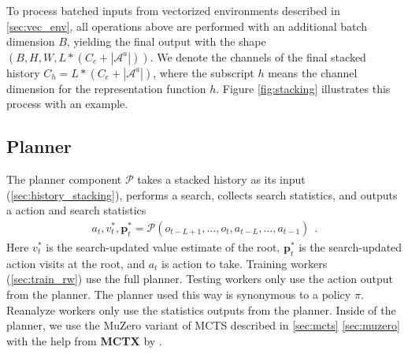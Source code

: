 To process batched inputs from vectorized environments described in \ref{sec:vec_env}, all operations above are performed with an additional batch dimension $B$, yielding the final output with the shape $(B, H, W, L * (C_e + |\mathcal{A}^a|))$.
We denote the channels of the final stacked history $C_h = L * (C_e + |\mathcal{A}^a|)$, where the subscript $h$ means the channel dimension for the representation function $h$.
Figure \ref{fig:stacking} illustrates this process with an example.


\subsection{Planner} \label{sec:planner}
The planner component $\mathcal{P}$ takes a stacked history as its input (\ref{sec:history_stacking}), performs a search, collects search statistics, and outputs a action and search statistics
\begin{align*}
    a_t, v^*_t, \mathbf{p}^*_t = \mathcal{P}(o_{t - L + 1}, \dots, o_t, a_{t - L}, \dots, a_{t - 1}) ~~ .
\end{align*}
Here $v^*_t$ is the search-updated value estimate of the root, $\mathbf{p}^*_t$ is the search-updated action visits at the root, and $a_t$ is action to take.
Training workers (\ref{sec:train_rw}) use the full planner.
Testing workers only use the action output from the planner.
The planner used this way is synonymous to a policy $\pi$.
Reanalyze workers only use the statistics outputs from the planner.
Inside of the planner, we use the MuZero variant of MCTS described in \ref{sec:mcts} \ref{sec:muzero} with the help from \textbf{MCTX} by \citeauthor{POLICYIMPROVEMENTPLANNING_Danihelka.Guez.ea_2022} \cite{POLICYIMPROVEMENTPLANNING_Danihelka.Guez.ea_2022}.

